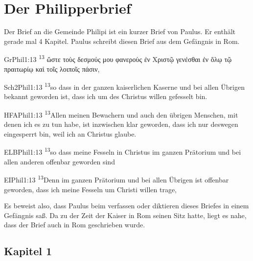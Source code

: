 \section {Der Philipperbrief}
Der Brief an die Gemeinde Philipi ist ein kurzer Brief von Paulus. Er enthält gerade mal 4 Kapitel. Paulus schreibt diesen Brief aus dem Gefängnis in Rom.

\begin{bibeltext}{Gr}{Phil}{1:13}
\textsuperscript{13}
\textgreek{ 	
	ὥστε τοὺς δεσμούς μου φανεροὺς ἐν Χριστῷ γενέσθαι ἐν ὅλῳ τῷ πραιτωρίῳ καὶ τοῖς λοιποῖς πάσιν, }
\end{bibeltext}

\begin{bibeltext}{Sch2}{Phil}{1:13}
	\textsuperscript{13}so dass in der ganzen kaiserlichen Kaserne und bei allen Übrigen bekannt geworden ist, dass ich um des Christus willen gefesselt bin.
\end{bibeltext}
\begin{bibeltext}{HFA}{Phil}{1:13}
	\textsuperscript{13}Allen meinen Bewachern und auch den übrigen Menschen, mit denen ich es zu tun habe, ist inzwischen klar geworden, dass ich nur deswegen eingesperrt bin, weil ich an Christus glaube.
\end{bibeltext}
\begin{bibeltext}{ELB}{Phil}{1:13}
	\textsuperscript{13}so dass meine Fesseln in Christus im ganzen Prätorium und bei allen anderen offenbar geworden sind 
\end{bibeltext}
\begin{bibeltext}{EI}{Phil}{1:13}
	\textsuperscript{13}Denn im ganzen Prätorium und bei allen Übrigen ist offenbar geworden, dass ich meine Fesseln um Christi willen trage,
\end{bibeltext}

Es beweist also, dass Paulus beim verfassen oder diktieren dieses Briefes in einem Gefängnis saß. Da zu der Zeit der Kaiser in Rom seinen Sitz hatte, liegt es nahe, dass der Brief auch in Rom geschrieben wurde.

\subsection{Kapitel 1}
